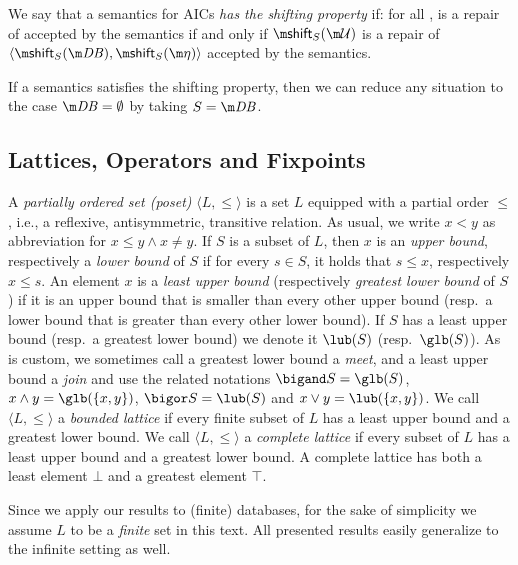 \begin{definition}
 We say that a semantics for AICs \emph{has the shifting property} if: for all \fulldb, \UU is a repair of \fulldb accepted by the semantics if and only if $\shift_S(\UU)$ is a repair of $\langle\shift_S(\db),\shift_S(\aics)\rangle$ accepted by the semantics.
\end{definition}

If a semantics satisfies the shifting property, then we can reduce any situation to the case $\db=\emptyset$ by taking $S=\db$. 
\subsection{Lattices, Operators and Fixpoints}
A \emph{partially ordered set (poset)} $\langle L,\leq\rangle$ is a set $L$ equipped with a partial order $\leq$, i.e., a reflexive, antisymmetric, transitive relation. 
As usual, we write $x<y$ as abbreviation for $x\leq y \land x\neq y$.
If $S$ is a subset of $L$, then $x$ is an \emph{upper bound}, respectively a \emph{lower bound} of $S$ if for every $s\in S$, it holds that $s\leq x$, respectively $x\leq s$. 
An element $x$ is a \emph{least upper bound} (respectively \emph{greatest lower bound} of $S$) if it is an upper bound that is smaller than every other upper bound (resp.\ a lower bound that is greater than every other lower bound).
If $S$ has a least upper bound (resp.\ a greatest lower bound) we denote it $\lub(S)$ (resp.\ $\glb(S)$).
As is custom, we sometimes call a greatest lower bound a \emph{meet}, and a least upper bound a \emph{join} and use the related notations $\bigand S = \glb(S)$, $x\land y=\glb(\{x,y\})$, $\bigor S = \lub(S)$ and $x\lor y=\lub(\{x,y\})$.
 We call $\langle L,\leq\rangle$ a \emph{bounded lattice}  if every finite subset of $L$ has a least upper bound and a greatest lower bound. 
 We call $\langle L,\leq\rangle$ a \emph{complete lattice}  if every subset of $L$ has a least upper bound and a greatest lower bound. 
A complete lattice has both a least element $\bot$ and a greatest element $\top$. 

Since we apply our results to (finite) databases, for the sake of simplicity we assume $L$ to be a \emph{finite} set in this text. All presented results easily generalize to the infinite setting as well. 

